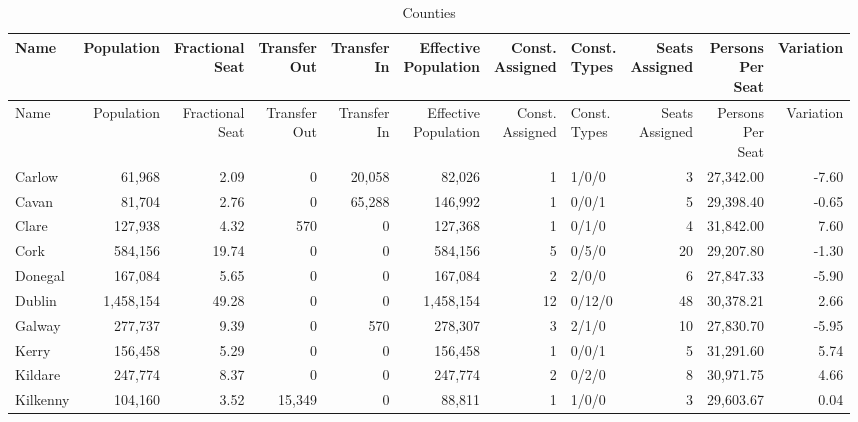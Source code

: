 \documentclass[a4paper]{article}
\begin{document}
\begin{longtable}{lrrrrrrlrrr}
\caption{Counties}
\\ \toprule
Name &Population &\shortstack{Fractional\\Seat} &\shortstack{Transfer\\Out} &\shortstack{Transfer\\In} &\shortstack{Effective\\Population} &\shortstack{Const.\\Assigned} &\shortstack{Const.\\Types} &\shortstack{Seats\\Assigned} &\shortstack{Persons\\Per\\Seat} &Variation \\ \midrule
\endfirsthead
\toprule
Name &Population &\shortstack{Fractional\\Seat} &\shortstack{Transfer\\Out} &\shortstack{Transfer\\In} &\shortstack{Effective\\Population} &\shortstack{Const.\\Assigned} &\shortstack{Const.\\Types} &\shortstack{Seats\\Assigned} &\shortstack{Persons\\Per\\Seat} &Variation \\ \midrule
\endhead
\bottomrule
\endfoot
Carlow&61,968& 2.09&0&20,058&82,026&1&1/0/0&3&27,342.00&-7.60\\ 
Cavan&81,704& 2.76&0&65,288&146,992&1&0/0/1&5&29,398.40&-0.65\\ 
Clare&127,938& 4.32&570&0&127,368&1&0/1/0&4&31,842.00& 7.60\\ 
Cork&584,156&19.74&0&0&584,156&5&0/5/0&20&29,207.80&-1.30\\ 
Donegal&167,084& 5.65&0&0&167,084&2&2/0/0&6&27,847.33&-5.90\\ 
Dublin&1,458,154&49.28&0&0&1,458,154&12&0/12/0&48&30,378.21& 2.66\\ 
Galway&277,737& 9.39&0&570&278,307&3&2/1/0&10&27,830.70&-5.95\\ 
Kerry&156,458& 5.29&0&0&156,458&1&0/0/1&5&31,291.60& 5.74\\ 
Kildare&247,774& 8.37&0&0&247,774&2&0/2/0&8&30,971.75& 4.66\\ 
Kilkenny&104,160& 3.52&15,349&0&88,811&1&1/0/0&3&29,603.67& 0.04\\ 

\end{longtable}
\end{document}
